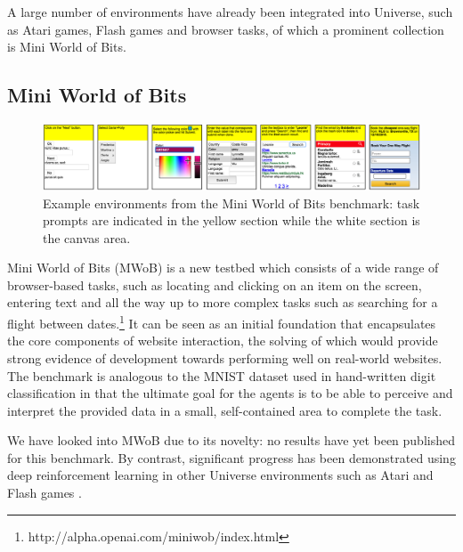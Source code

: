 \documentclass[10pt,journal,compsoc]{IEEEtran}
\begin{document}
A large number of environments have already been integrated into Universe, such as Atari games, Flash games and browser tasks, of which a prominent collection is Mini World of Bits.

\subsection{Mini World of Bits}

\begin{figure}[t]
	\includegraphics[width=\textwidth, height=\textheight, keepaspectratio]{mwob.png}
	\caption{Example environments from the Mini World of Bits benchmark:
	task prompts are indicated in the yellow section while the white section is the canvas area.}
	\label{fig:mwob}
\end{figure}

Mini World of Bits (MWoB) %
is a new testbed which consists of a wide range of browser-based tasks, such as locating and clicking on an item on the screen, entering text and all the way up to more complex tasks such as searching for a flight between dates.\footnote[1]{http://alpha.openai.com/miniwob/index.html} It can be seen as an initial foundation that encapsulates the core components of website interaction, the solving of which would provide strong evidence of development towards performing well on real-world websites. The benchmark is analogous to the MNIST dataset \cite{lecun1998gradient} used in hand-written digit classification in that the ultimate goal for the agents is to be able to perceive and interpret the provided data in a small, self-contained area to complete the task.

We have looked into MWoB due to its novelty: no results have yet been published for this benchmark. By contrast, significant progress has been demonstrated using deep reinforcement learning in other Universe environments such as Atari and Flash games \cite{deepqlearning}.
\end{document}
